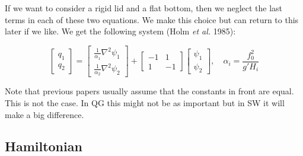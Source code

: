 \documentclass[12pt]{article}
\begin{document}
  If we want to consider a rigid lid and a flat bottom, then we neglect the last terms in each of these two equations.  We make this choice but can return to this later if we like. We get the following system (Holm \emph{et al.} 1985):

  \begin{equation}
    \left[\begin{array}{c}
      q_1 \\
      q_2
    \end{array}\right]
    =
    \left[\begin{array}{c}
      \frac{1}{\alpha_1}\nabla^2 \psi_1 \\
      \frac{1}{\alpha_2}\nabla^2 \psi_2
    \end{array}\right]
    +
    \left[\begin{array}{cc}
      -1 & 1 \\
      1 & -1
    \end{array}\right]
    \left[\begin{array}{c}
      \psi_1 \\
      \psi_2
    \end{array}\right],
    \quad \alpha_i = \frac{f_0^2}{g'H_i}
  \end{equation}

  Note that previous papers usually assume that the constants in front are equal. This is not the case.  In QG this might not be as important but in SW it will make a big difference.

  \subsection{Hamiltonian}
\end{document}

